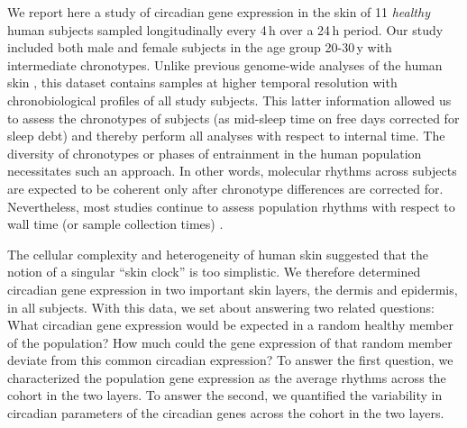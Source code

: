 \normalsize

We report here a study of circadian gene expression in the skin of 11 \textit{healthy} human subjects sampled longitudinally every 4\,h over a 24\,h period. Our study included both male and female subjects in the age group 20-30\,y with intermediate chronotypes. Unlike previous genome-wide analyses of the human skin \cite{Wu2018,Wu2020}, this dataset contains samples at higher temporal resolution with chronobiological profiles of all study subjects. This latter information allowed us to assess the chronotypes of subjects (as mid-sleep time on free days corrected for sleep debt) and thereby perform all analyses with respect to internal time. The diversity of chronotypes or phases of entrainment in the human population \cite{Roenneberg2007} necessitates such an approach. In other words, molecular rhythms across subjects are expected to be coherent only after chronotype differences are corrected for. Nevertheless, most studies continue to assess population rhythms with respect to wall time (or sample collection times) \cite{Laing2019}.

The cellular complexity and heterogeneity of human skin \cite{Plikus2015} suggested that the notion of a singular ``skin clock'' is too simplistic. We therefore determined circadian gene expression in two important skin layers, the dermis and epidermis, in all subjects. With this data, we set about answering two related questions: What circadian gene expression would be expected in a random healthy member of the population? How much could the gene expression of that random member deviate from this common circadian expression? To answer the first question, we characterized the population gene expression as the average rhythms across the cohort in the two layers. To answer the second, we quantified the variability in circadian parameters of the circadian genes across the cohort in the two layers.


